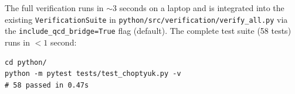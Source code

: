 The full verification runs in $\sim 3$ seconds on a laptop and is
integrated into the existing
\texttt{VerificationSuite} in
\texttt{python/src/verification/verify\_all.py} via the
\texttt{include\_qcd\_bridge=True} flag (default).  The complete test
suite (58 tests) runs in $<1$ second:
\begin{verbatim}
cd python/
python -m pytest tests/test_choptyuk.py -v
# 58 passed in 0.47s
\end{verbatim}

